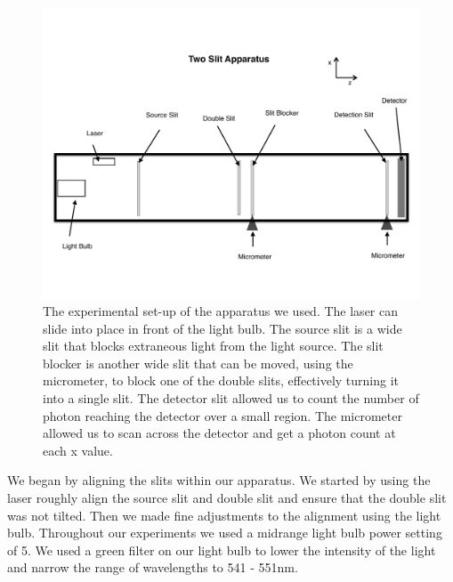 \documentclass[prb,preprint]{revtex4-1}
\begin{document}
\begin{figure}[h!]
\centering
\includegraphics[width=6in]{apparatus.pdf}
\caption{The experimental set-up of the apparatus we used. The laser can slide into place in front of the light bulb. The source slit is a wide slit that blocks extraneous light from the light source. The slit blocker is another wide slit that can be moved, using the micrometer, to block one of the double slits, effectively turning it into a single slit. The detector slit allowed us to count the number of photon reaching the detector over a small region. The micrometer allowed us to scan across the detector and get a photon count at each x value.}
\label{apparatus}
\end{figure}


We began by aligning the slits within our apparatus. We started by using the laser roughly align the source slit and double slit and ensure that the double slit was not tilted. Then we made fine adjustments to the alignment using the light bulb. Throughout our experiments we used a midrange light bulb power setting of 5. We used a green filter on our light bulb to lower the intensity of the light and narrow the range of wavelengths to 541 - 551nm. 
\end{document}
